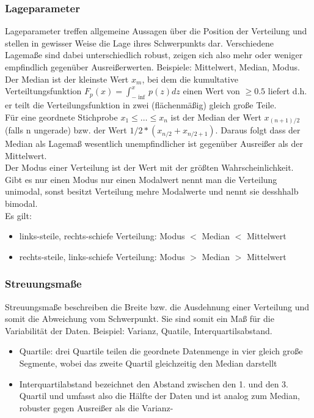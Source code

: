 \documentclass{article} %
\begin{document}
		\subsubsection{Lageparameter}
		Lageparameter treffen allgemeine Aussagen über die Position der Verteilung und stellen in gewisser Weise die Lage ihres Schwerpunkts dar. Verschiedene Lagemaße sind dabei unterschiedlich robust, zeigen sich also mehr oder weniger empfindlich gegenüber Ausreißerwerten. Beispiele: Mittelwert, Median, Modus.\\
		Der Median ist der kleinste Wert $x_m$, bei dem die kumultative Verteiltungsfunktion $F_p(x) = \int_{-\inf}^{x} p(z) dz$ einen Wert von $\geq 0.5$ liefert d.h. er teilt die Verteilungsfunktion in zwei (flächenmäßig) gleich große Teile.\\
		Für eine geordnete Stichprobe $x_1\leq\dots\leq x_n$ ist der Median der Wert $x_{(n+1)/2}$ (falls n ungerade) bzw. der Wert $1/2*(x_{n/2}+x_{n/2+1})$. Daraus folgt dass der Median als Lagemaß wesentlich unempfindlicher ist gegenüber Ausreißer als der Mittelwert.\\
		Der Modus einer Verteilung ist der Wert mit der größten Wahrscheinlichkeit. Gibt es nur einen Modus nur einen Modalwert nennt man die Verteilung unimodal, sonst besitzt Verteilung  mehre  Modalwerte und nennt sie desshhalb bimodal.\\
		Es gilt:
		\begin{itemize}
			\item links-steile, rechts-schiefe Verteilung: Modus $<$ Median $<$ Mittelwert
			\item rechts-steile, links-schiefe Verteilung: Modus $>$ Median $>$ Mittelwert
		\end{itemize}
		\subsubsection{Streuungsmaße}
		Streuungsmaße beschreiben die Breite bzw. die Ausdehnung einer Verteilung und somit die Abweichung vom Schwerpunkt. Sie sind somit ein Maß für die Variabilität der Daten. Beispiel: Varianz, Quatile, Interquartilsabstand.
		\begin{itemize}
			\item Quartile: drei Quartile teilen die geordnete Datenmenge in vier gleich große Segmente, wobei das zweite Quartil gleichzeitig den Median darstellt
			\item Interquartilabstand bezeichnet den Abstand zwischen den 1. und den 3. Quartil und umfasst also die Hälfte der Daten und ist analog zum Median, robuster gegen Ausreißer als die Varianz-
		\end{itemize}	
\end{document}
